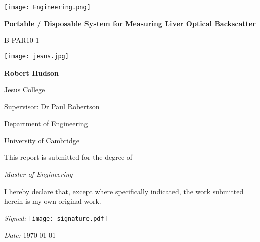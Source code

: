 \begin{titlepage}
\texttt{[image: Engineering.png]}\par
    \begin{centering}
        \vspace{1cm}
        {\huge\bfseries Portable / Disposable System for Measuring Liver Optical Backscatter\par}
        \vspace{0.5cm}
        {\Large B-PAR10-1}\par
        \vspace{1cm}
        \texttt{[image: jesus.jpg]}\par
        \vspace{1cm}
        {\Large\bfseries Robert Hudson}\par
        {\Large
        Jesus College\par
        \vspace{0.5cm}
        Supervisor: Dr Paul Robertson\par
        \vspace{0.5cm}
        Department of Engineering \par
        University of Cambridge \par
        \vspace{0.5cm}
        This report is submitted for the degree of \par
        {\em Master of Engineering}
        }

    \end{centering}
    \vfill

    {\footnotesize \noindent I hereby declare that, except where specifically indicated, the work submitted herein is my own original work.}\par
    \vspace{0.5cm}
    \begin{minipage}[t]{0.5\linewidth}
        {\small\textit{Signed:}}
      	\texttt{[image: signature.pdf]}
    \end{minipage}
    \hfill
    \begin{minipage}[t]{0.3\linewidth}
        {\small\textit{Date:} \today}
    \end{minipage}

\end{titlepage}